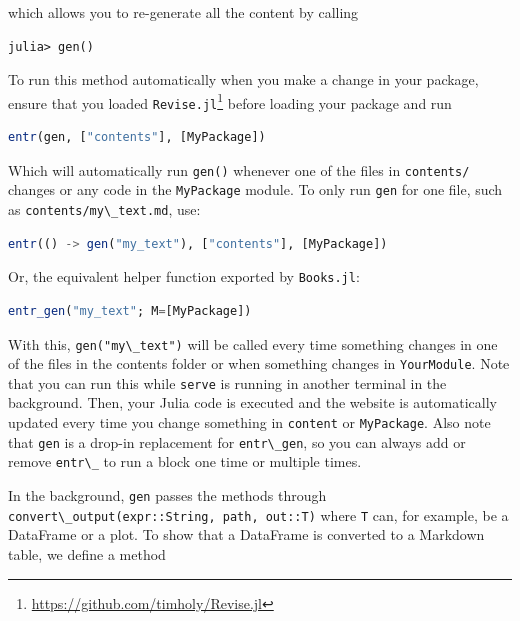 \documentclass[
  notoc %
]{tufte-book}
\DeclareRobustCommand{\href}[2]{#2\footnote{\url{#1}}}
\newcommand{\passthrough}[1]{#1}
\begin{document}
which allows you to re-generate all the content by calling

\begin{lstlisting}
julia> gen()
\end{lstlisting}

To run this method automatically when you make a change in your package,
ensure that you loaded
\href{https://github.com/timholy/Revise.jl}{\passthrough{\lstinline!Revise.jl!}}
before loading your package and run

\begin{lstlisting}[language=Julia]
entr(gen, ["contents"], [MyPackage])
\end{lstlisting}

Which will automatically run \passthrough{\lstinline!gen()!} whenever
one of the files in \passthrough{\lstinline!contents/!} changes or any
code in the \passthrough{\lstinline!MyPackage!} module. To only run
\passthrough{\lstinline!gen!} for one file, such as
\passthrough{\lstinline!contents/my\_text.md!}, use:

\begin{lstlisting}[language=Julia]
entr(() -> gen("my_text"), ["contents"], [MyPackage])
\end{lstlisting}

Or, the equivalent helper function exported by
\passthrough{\lstinline!Books.jl!}:

\begin{lstlisting}[language=Julia]
entr_gen("my_text"; M=[MyPackage])
\end{lstlisting}

With this, \passthrough{\lstinline!gen("my\_text")!} will be called
every time something changes in one of the files in the contents folder
or when something changes in \passthrough{\lstinline!YourModule!}. Note
that you can run this while \passthrough{\lstinline!serve!} is running
in another terminal in the background. Then, your Julia code is executed
and the website is automatically updated every time you change something
in \passthrough{\lstinline!content!} or
\passthrough{\lstinline!MyPackage!}. Also note that
\passthrough{\lstinline!gen!} is a drop-in replacement for
\passthrough{\lstinline!entr\_gen!}, so you can always add or remove
\passthrough{\lstinline!entr\_!} to run a block one time or multiple
times.

In the background, \passthrough{\lstinline!gen!} passes the methods
through
\passthrough{\lstinline!convert\_output(expr::String, path, out::T)!}
where \passthrough{\lstinline!T!} can, for example, be a DataFrame or a
plot. To show that a DataFrame is converted to a Markdown table, we
define a method
\end{document}
